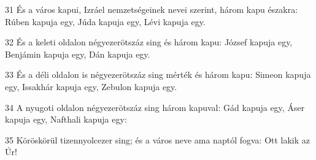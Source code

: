 \par 31 És a város kapui, Izráel nemzetségeinek nevei szerint, három kapu északra: Rúben kapuja egy, Júda kapuja egy, Lévi kapuja egy.
\par 32 És a keleti oldalon négyezerötszáz sing és három kapu: József kapuja egy, Benjámin kapuja egy, Dán kapuja egy.
\par 33 És a déli oldalon is négyezerötszáz sing mérték és három kapu: Simeon kapuja egy, Issakhár kapuja egy, Zebulon kapuja egy.
\par 34 A nyugoti oldalon négyezerötszáz sing három kapuval: Gád kapuja egy, Áser kapuja egy, Nafthali kapuja egy:
\par 35 Köröskörül tizennyolcezer sing; és a város neve ama naptól fogva: Ott lakik az Úr!


